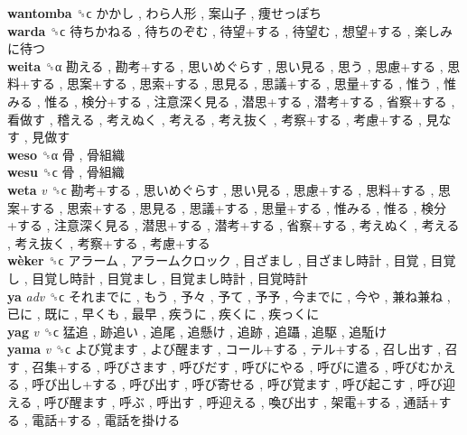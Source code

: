 \textbf{wantomba} ␝ϲ   かかし ,  わら人形 ,  案山子 ,  痩せっぽち   \\
\textbf{warda} ␝ϲ   待ちかねる ,  待ちのぞむ ,  待望+する ,  待望む ,  想望+する ,  楽しみに待つ   \\
\textbf{weita} ␝α   勘える ,  勘考+する ,  思いめぐらす ,  思い見る ,  思う ,  思慮+する ,  思料+する ,  思案+する ,  思索+する ,  思見る ,  思議+する ,  思量+する ,  惟う ,  惟みる ,  惟る ,  検分+する ,  注意深く見る ,  潜思+する ,  潜考+する ,  省察+する ,  看做す ,  稽える ,  考えぬく ,  考える ,  考え抜く ,  考察+する ,  考慮+する ,  見なす ,  見做す   \\
\textbf{weso} ␝α   骨 ,  骨組織   \\
\textbf{wesu} ␝ϲ   骨 ,  骨組織   \\
\textbf{weta} \emph{v}  ␝ϲ   勘考+する ,  思いめぐらす ,  思い見る ,  思慮+する ,  思料+する ,  思案+する ,  思索+する ,  思見る ,  思議+する ,  思量+する ,  惟みる ,  惟る ,  検分+する ,  注意深く見る ,  潜思+する ,  潜考+する ,  省察+する ,  考えぬく ,  考える ,  考え抜く ,  考察+する ,  考慮+する   \\
\textbf{wèker} ␝ϲ   アラーム ,  アラームクロック ,  目ざまし ,  目ざまし時計 ,  目覚 ,  目覚し ,  目覚し時計 ,  目覚まし ,  目覚まし時計 ,  目覚時計   \\
\textbf{ya} \emph{adv}  ␝ϲ   それまでに ,  もう ,  予々 ,  予て ,  予予 ,  今までに ,  今や ,  兼ね兼ね ,  已に ,  既に ,  早くも ,  最早 ,  疾うに ,  疾くに ,  疾っくに   \\
\textbf{yag} \emph{v}  ␝ϲ   猛追 ,  跡追い ,  追尾 ,  追懸け ,  追跡 ,  追躡 ,  追駆 ,  追駈け   \\
\textbf{yama} \emph{v}  ␝ϲ   よび覚ます ,  よび醒ます ,  コール+する ,  テル+する ,  召し出す ,  召す ,  召集+する ,  呼びさます ,  呼びだす ,  呼びにやる ,  呼びに遣る ,  呼びむかえる ,  呼び出し+する ,  呼び出す ,  呼び寄せる ,  呼び覚ます ,  呼び起こす ,  呼び迎える ,  呼び醒ます ,  呼ぶ ,  呼出す ,  呼迎える ,  喚び出す ,  架電+する ,  通話+する ,  電話+する ,  電話を掛ける   \\
